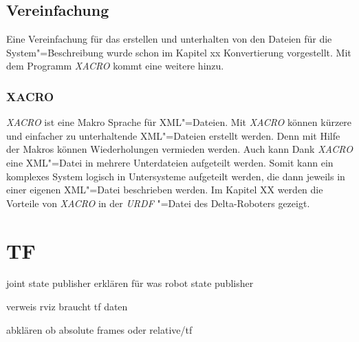 \subsection{Vereinfachung}
Eine Vereinfachung für das erstellen und unterhalten von den Dateien für die System"=Beschreibung wurde schon im Kapitel xx Konvertierung vorgestellt. %
Mit dem Programm \textit{XACRO} kommt eine weitere hinzu. 

\subsubsection{XACRO}
\textit{XACRO} ist eine Makro Sprache für XML"=Dateien. %
Mit \textit{XACRO} können kürzere und einfacher zu unterhaltende XML"=Dateien erstellt werden.
Denn mit Hilfe der Makros können Wiederholungen vermieden werden.
Auch kann Dank \textit{XACRO} eine XML"=Datei in mehrere Unterdateien aufgeteilt werden.
Somit kann ein komplexes System logisch in Untersysteme aufgeteilt werden, die dann jeweils in einer eigenen XML"=Datei beschrieben werden. 
Im Kapitel XX werden die Vorteile von \textit{XACRO} in der \textit{URDF} "=Datei des Delta-Roboters gezeigt.

\section{TF}
joint state publisher erklären für was
robot state publisher

verweis rviz braucht tf daten

abklären ob absolute frames oder relative/tf

